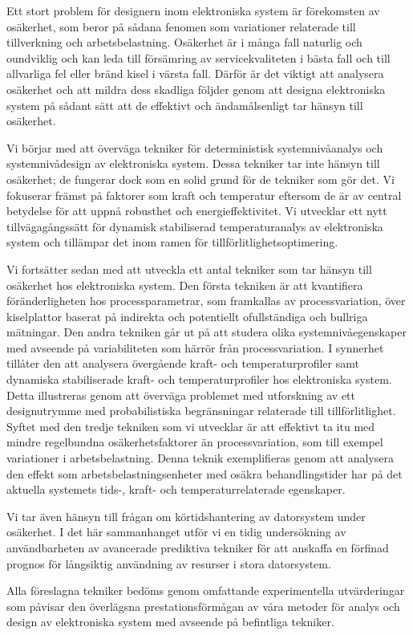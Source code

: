 Ett stort problem för designern inom elektroniska system är förekomsten av
osäkerhet, som beror på sådana fenomen som variationer relaterade till
tillverkning och arbetsbelastning. Osäkerhet är i många fall naturlig och
oundviklig och kan leda till försämring av servicekvaliteten i bästa fall och
till allvarliga fel eller bränd kisel i värsta fall. Därför är det viktigt att
analysera osäkerhet och att mildra dess skadliga följder genom att designa
elektroniska system på sådant sätt att de effektivt och ändamålsenligt tar
hänsyn till osäkerhet.

Vi börjar med att överväga tekniker för deterministisk systemnivåanalys och
systemnivådesign av elektroniska system. Dessa tekniker tar inte hänsyn till
osäkerhet; de fungerar dock som en solid grund för de tekniker som gör det. Vi
fokuserar främst på faktorer som kraft och temperatur eftersom de är av central
betydelse för att uppnå robusthet och energieffektivitet. Vi utvecklar ett nytt
tillvägagångssätt för dynamisk stabiliserad temperaturanalys av elektroniska
system och tillämpar det inom ramen för tillförlitlighetsoptimering.

Vi fortsätter sedan med att utveckla ett antal tekniker som tar hänsyn till
osäkerhet hos elektroniska system. Den första tekniken är att kvantifiera
föränderligheten hos processparametrar, som framkallas av processvariation, över
kiselplattor baserat på indirekta och potentiellt ofullständiga och bullriga
mätningar. Den andra tekniken går ut på att studera olika systemnivåegenskaper
med avseende på variabiliteten som härrör från processvariation. I synnerhet
tillåter den att analysera övergående kraft- och temperaturprofiler samt
dynamiska stabiliserade kraft- och temperaturprofiler hos elektroniska system.
Detta illustreras genom att överväga problemet med utforskning av ett
designutrymme med probabilistiska begränsningar relaterade till
tillförlitlighet. Syftet med den tredje tekniken som vi utvecklar är att
effektivt ta itu med mindre regelbundna osäkerhetsfaktorer än processvariation,
som till exempel variationer i arbetsbelastning. Denna teknik exemplifieras
genom att analysera den effekt som arbetsbelastningsenheter med osäkra
behandlingstider har på det aktuella systemets tids-, kraft- och
temperaturrelaterade egenskaper.

Vi tar även hänsyn till frågan om körtidshantering av datorsystem under
osäkerhet. I det här sammanhanget utför vi en tidig undersökning av
användbarheten av avancerade prediktiva tekniker för att anskaffa en förfinad
prognos för långsiktig användning av resurser i stora datorsystem.

Alla föreslagna tekniker bedöms genom omfattande experimentella utvärderingar
som påvisar den överlägsna prestationsförmågan av våra metoder för analys och
design av elektroniska system med avseende på befintliga tekniker.

